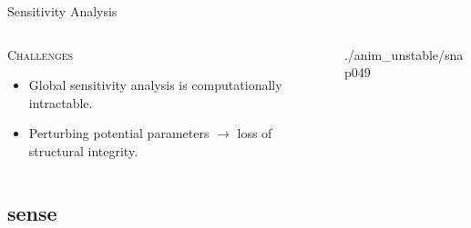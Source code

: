 \documentclass[xcolor={x11names,table},compress,svgnames,mathserif]{beamer}
\renewcommand{\(}{\begin{columns}}
\renewcommand{\)}{\end{columns}}
\newcommand{\<}[1]{\begin{column}{#1}}
\renewcommand{\>}{\end{column}}
\newcommand*\Myitem{%
  \item[\color{DeepSkyBlue4}\scalebox{0.9}{\ding{42}}]}
\begin{document}
\begin{frame}{Sensitivity Analysis}

\begin{columns}
\begin{column}{0.55\textwidth}
\textsc{Challenges}

\vspace{2mm}
\begin{itemize}

\Myitem Global sensitivity analysis is {\color{pigment}computationally intractable}.
\vspace{2mm}
\Myitem Perturbing potential parameters $\rightarrow$ loss of {\color{pigment}structural integrity}. 
\end{itemize}
\end{column}

\begin{column}{0.45\textwidth}
\begin{center}
      {./anim_unstable/snap}{0}{49}

  \end{center}
  
 \end{column}
\end{columns}

\end{frame}


\subsection{sense}
\end{document}
